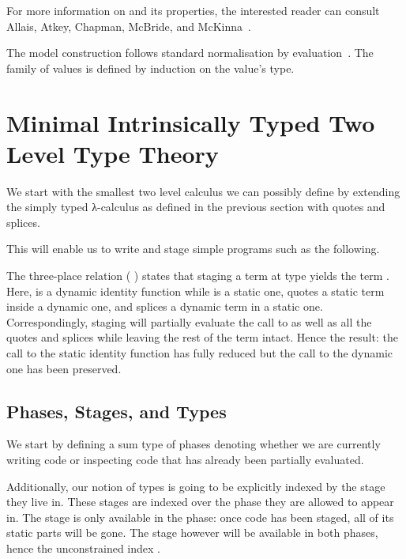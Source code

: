 \documentclass{article}
\begin{document}
For more information on  and its properties, the interested
reader can consult Allais, Atkey, Chapman, McBride, and
McKinna~\cite[Section~3.1]{DBLP:journals/jfp/AllaisACMM21}.
%


The model construction follows standard normalisation by
evaluation~\cite{DBLP:conf/lics/BergerS91,DBLP:journals/mscs/CoquandD97,DBLP:journals/lisp/Coquand02}.
The family of values is defined by induction on the value's
type.


\section{Minimal Intrinsically Typed Two Level Type Theory}

We start with the smallest two level calculus we can possibly define
by extending the simply typed λ-calculus as defined in the previous
section with quotes and splices.

This will enable us to write and stage simple programs such as the following.


The three-place relation (    ) states
that staging a term  at type  yields the term .
%
Here,  is a dynamic identity function
while  is a static one,
 quotes a static term inside a dynamic one,
and  splices a dynamic term in a static one.
%
Correspondingly, staging will partially evaluate the call to
 as well as all the quotes and splices while leaving
the rest of the term intact.
%
Hence the result: the call to the static identity function has
fully reduced but the call to the dynamic one has been preserved.


\subsection{Phases, Stages, and Types}

We start by defining a sum type of phases denoting whether
we are currently writing  code or inspecting
 code that has already been partially evaluated.


Additionally, our notion of types is going to be explicitly
indexed by the stage they live in. These stages are indexed
over the phase they are allowed to appear in.
%
The  stage is only available in the 
phase: once code has been staged, all of its static parts will
be gone.
%
The  stage however will be available in both
phases, hence the unconstrained index .
\end{document}
